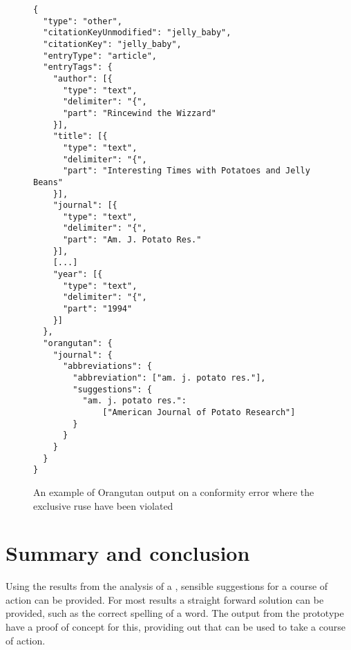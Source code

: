 \begin{figure}
  \centering
\begin{verbatim}
{
  "type": "other",
  "citationKeyUnmodified": "jelly_baby",
  "citationKey": "jelly_baby",
  "entryType": "article",
  "entryTags": {
    "author": [{
      "type": "text",
      "delimiter": "{",
      "part": "Rincewind the Wizzard"
    }],
    "title": [{
      "type": "text",
      "delimiter": "{",
      "part": "Interesting Times with Potatoes and Jelly Beans"
    }],
    "journal": [{
      "type": "text",
      "delimiter": "{",
      "part": "Am. J. Potato Res."
    }],
    [...]
    "year": [{
      "type": "text",
      "delimiter": "{",
      "part": "1994"
    }]
  },
  "orangutan": {
    "journal": {
      "abbreviations": {
        "abbreviation": ["am. j. potato res."],
        "suggestions": {
          "am. j. potato res.":
              ["American Journal of Potato Research"]
        }
      }
    }
  }
}
\end{verbatim}
\caption{An example of Orangutan output on a conformity error where
  the exclusive ruse have been violated}
\label{fig:orgazing_complete}
\end{figure}


\section{Summary and conclusion}

Using the results from the analysis of a , sensible
suggestions for a course of action can be provided.  For most results
a straight forward solution can be provided, such as the correct
spelling of a word.  The output from the prototype {\orangutan} have a
proof of concept for this, providing out that can be used to take a
course of action.
